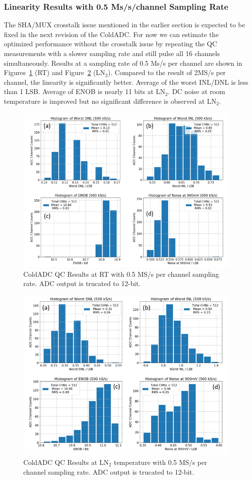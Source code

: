 \subsubsection{Linearity Results with 0.5 Ms/s/channel Sampling Rate}
The SHA/MUX crosstalk issue mentioned in the earlier section is expected to be fixed in the next revision of the ColdADC.
For now we can estimate the optimized performance without the crosstalk issue by repeating the QC measurements with a slower 
sampling rate and still pulse all 16 channels simultaneously.
Results at a sampling rate of 0.5 Ms/s per channel are shown in Figures~\ref{fig:qc_lin500Kwarm} (RT) and Figure~\ref{fig:qc_lin500Kcold} (LN$_2$). 
Compared to the result of 2MS/s per channel, the linearity is significantly better. Average of the worst INL/DNL is less than 1 LSB.
Average of ENOB is nearly 11 bits at LN$_2$.  DC noise at room temperature is improved but no significant difference is observed at LN$_2$.
\begin{figure}[h!]
\centering
  \includegraphics[width=0.85\linewidth]{figures/qc_lin500Kwarm.png}
  \caption{ColdADC QC Results at RT with 0.5 MS/s per channel sampling rate. ADC output is trucated to 12-bit.}
  \label{fig:qc_lin500Kwarm}
\end{figure}
\begin{figure}[h!]
\centering
  \includegraphics[width=0.85\linewidth]{figures/qc_lin500Kcold.png}
  \caption{ColdADC QC Results at LN$_2$ temperature with 0.5 MS/s per channel sampling rate. ADC output is trucated to 12-bit.}
  \label{fig:qc_lin500Kcold}
\end{figure}
